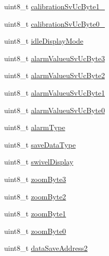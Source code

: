 \begin{DoxyCompactItemize}
\item 
uint8\-\_\-t \hyperlink{struct_g_q_l_l_c_1_1_g_q_g_m_c_1_1cfg__data__t_aac8f5eceb6a3465f5776f768a729230a}{calibration\-Sv\-Uc\-Byte1\-\_}
\item 
uint8\-\_\-t \hyperlink{struct_g_q_l_l_c_1_1_g_q_g_m_c_1_1cfg__data__t_a4a3398503a96d7ec0f96191212e8bc94}{calibration\-Sv\-Uc\-Byte0\-\_}
\item 
uint8\-\_\-t \hyperlink{struct_g_q_l_l_c_1_1_g_q_g_m_c_1_1cfg__data__t_ad5207b7a8e1701a3f81aa964c2d82504}{idle\-Display\-Mode}
\item 
uint8\-\_\-t \hyperlink{struct_g_q_l_l_c_1_1_g_q_g_m_c_1_1cfg__data__t_a45cdd7079bd8d628b33bab9242795003}{alarm\-Valueu\-Sv\-Uc\-Byte3}
\item 
uint8\-\_\-t \hyperlink{struct_g_q_l_l_c_1_1_g_q_g_m_c_1_1cfg__data__t_a3dbfaed989ff3ddc442e2722ed1ed109}{alarm\-Valueu\-Sv\-Uc\-Byte2}
\item 
uint8\-\_\-t \hyperlink{struct_g_q_l_l_c_1_1_g_q_g_m_c_1_1cfg__data__t_a8b2e2782cce0ee64440862a28def1d23}{alarm\-Valueu\-Sv\-Uc\-Byte1}
\item 
uint8\-\_\-t \hyperlink{struct_g_q_l_l_c_1_1_g_q_g_m_c_1_1cfg__data__t_ab1b490c2fc926d4c497001ad88657eb1}{alarm\-Valueu\-Sv\-Uc\-Byte0}
\item 
uint8\-\_\-t \hyperlink{struct_g_q_l_l_c_1_1_g_q_g_m_c_1_1cfg__data__t_a986e7e731b0e0f829d704786ba2e1311}{alarm\-Type}
\item 
uint8\-\_\-t \hyperlink{struct_g_q_l_l_c_1_1_g_q_g_m_c_1_1cfg__data__t_a90f3b19ce1519778df45abdb919424a7}{save\-Data\-Type}
\item 
uint8\-\_\-t \hyperlink{struct_g_q_l_l_c_1_1_g_q_g_m_c_1_1cfg__data__t_adb78fb43fd0723347f8c5b35786563b7}{swivel\-Display}
\item 
uint8\-\_\-t \hyperlink{struct_g_q_l_l_c_1_1_g_q_g_m_c_1_1cfg__data__t_a7fb5a0670c617aeec55496721b221b72}{zoom\-Byte3}
\item 
uint8\-\_\-t \hyperlink{struct_g_q_l_l_c_1_1_g_q_g_m_c_1_1cfg__data__t_af3aa51863e9892742b198f81275b6dae}{zoom\-Byte2}
\item 
uint8\-\_\-t \hyperlink{struct_g_q_l_l_c_1_1_g_q_g_m_c_1_1cfg__data__t_a65ee99734da48f879e577246364a327d}{zoom\-Byte1}
\item 
uint8\-\_\-t \hyperlink{struct_g_q_l_l_c_1_1_g_q_g_m_c_1_1cfg__data__t_a25506ec0198318cb1a5581cbaaec8b1e}{zoom\-Byte0}
\item 
uint8\-\_\-t \hyperlink{struct_g_q_l_l_c_1_1_g_q_g_m_c_1_1cfg__data__t_ac2dc2263e472d448f8aec59c08143c56}{data\-Save\-Address2}

\end{DoxyCompactItemize}
